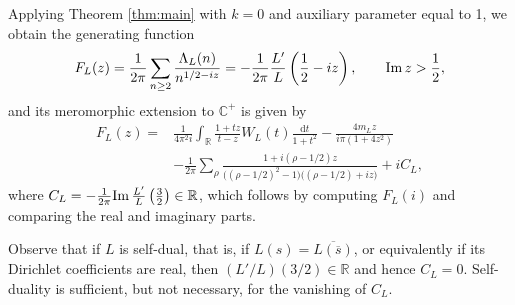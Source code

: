 \documentclass[a4paper,reqno,12pt]{amsart}
\renewcommand{\r}{\mathbb{R}}
\newcommand{\cp}{\mathbb{C}} %
\renewcommand{\d}{\mathrm{d}}
\newcommand{\ov}[1]{\overline{#1}}
\newcommand{\1}{{\bf 1}}
\renewcommand{\Im}{{\rm Im}\,}
\begin{document}
Applying Theorem \ref{thm:main} with $k=0$ and auxiliary parameter equal to 1, we obtain the generating function
\begin{equation}
\label{eq:Selberg_generating_function}
    F_L(z)=\frac{1}{2\pi}\sum_{n\geq2}
    \frac{\Lambda_L(n)}{n^{1/2-iz}}
    =-\frac{1}{2\pi}\frac{L'}{L}\left(\frac12-iz\right),
    \qquad \Im z>\frac12,
\end{equation}
and its meromorphic extension to $\cp^+$ is given by
\begin{align}
\label{eq:Selberg_meromorphic_continuation}
    F_L(z)={}&\frac{1}{4\pi^2 i}\int_{\r}
    \frac{1+tz}{t-z}W_L(t)\frac{\d t}{1+t^2}
    -\frac{4m_Lz}{i\pi(1+4z^2)}\\
    &-\frac{1}{2\pi}\sum_{\rho}
    \frac{1+i(\rho-1/2)z}
    {\bigl((\rho-1/2)^2-1\bigr)\bigl((\rho-1/2)+iz\bigr)}
    +iC_L,
\end{align}
where $C_L=-\frac{1}{2\pi}\Im\frac{L'}{L}\left(\frac32\right)\in\r$, which follows by computing $F_L(i)$ and comparing the real and imaginary parts.

Observe that if $L$ is self-dual, that is, if $L(s)=\ov{L(\ov{s})}$, or equivalently if its Dirichlet coefficients are real, then $(L'/L)(3/2)\in\r$ and hence $C_L=0$. Self-duality is sufficient, but not necessary, for the vanishing of $C_L$.
\end{document}
